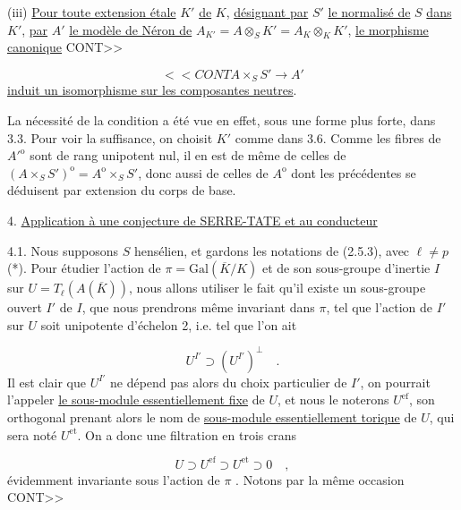 (iii) \quad \underline{Pour toute extension étale} $K'$ \underline{de} $K$, \underline{désignant par} $S'$ \underline{le normalisé de} $S$ \underline{dans} $K'$, \underline{par} $A'$ \underline{le modèle de Néron de} $A_{K'} = A\otimes_S K'=A_K\otimes_K K'$, \underline{le morphisme canonique} CONT>>



\begin{equation*}
<<CONT A\times_S S' \longrightarrow A'
\end{equation*}
\underline{induit un isomorphisme sur les composantes neutres}.

La nécessité de la condition a été vue en effet, sous une forme plus forte, dans 3.3. Pour voir la suffisance, on choisit $K'$ comme dans 3.6. Comme les fibres de ${A'}^{\mathrm{o}}$ sont de rang unipotent nul, il en est de même de celles de $(A\times_S S')^{\mathrm{o}} = A^{\mathrm{o}}\times_S S'$, donc aussi de celles de $A^{\mathrm{o}}$ dont les précédentes se déduisent par extension du corps de base.


4. \underline{Application à une conjecture de SERRE-TATE et au conducteur}

4.1. \quad Nous supposons $S$ hensélien, et gardons les notations de (2.5.3), avec $\ell \neq p$ (*). Pour étudier l'action de $\pi = \mathrm{Gal}(\overline{K}/K)$ et de son sous-groupe d'inertie $I$ sur $U = T_\ell(A(\overline{K}))$, nous allons utiliser le fait qu'il existe un sous-groupe ouvert $I'$ de $I$, que nous prendrons même invariant dans $\pi$, tel que l'action de $I'$ sur $U$ soit unipotente d'échelon 2, i.e. tel que l'on ait

\begin{equation*}
U^{I'} \supset (U^{I'})^{\perp} \quad .
\end{equation*}
Il est clair que $U^{I'}$ ne dépend pas alors du choix particulier de $I'$, on pourrait l'appeler \underline{le sous-module essentiellement fixe} de $U$, et nous le noterons $U^{\mathrm{ef}}$, son orthogonal prenant alors le nom de \underline{sous-module essentiellement torique} de $U$, qui sera noté $U^{\mathrm{et}}$. On a donc une filtration en trois crans

\begin{equation}\tag{4.1.1}
U \supset U^{\mathrm{ef}} \supset U^{\mathrm{et}} \supset 0 \quad ,
\end{equation}
évidemment invariante sous l'action de $\pi$ . Notons par la même occasion CONT>>

